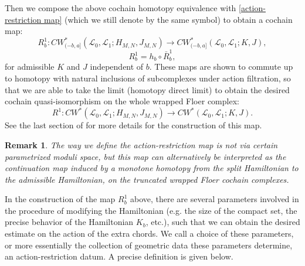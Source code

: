 \documentclass{amsart}
\newtheorem{remark}[theorem]{Remark}
\numberwithin{equation}{section}
\numberwithin{figure}{section}
\begin{document}
	Then we compose the above cochain homotopy equivalence with \eqref{action-restriction map} (which we still denote by the same symbol) to obtain a cochain map:
\begin{equation}\label{action-restriction map, with a Hamiltonian independent of filtration}
R^{1}_{b}: CW^{*}_{(-b, a]}(\mathcal{L}_{0}, \mathcal{L}_{1}; H_{M, N}, J_{M, N}) \to CW^{*}_{(-b, a]}(\mathcal{L}_{0}, \mathcal{L}_{1}; K, J),
\end{equation}
\begin{equation}
R^{1}_{b} = h_{b} \circ \bar{R}^{1}_{b},
\end{equation}
for admissible $K$ and $J$ independent of $b$. These maps are shown to commute up to homotopy with natural inclusions of subcomplexes under action filtration, so that we are able to take the limit (homotopy direct limit) to obtain the desired cochain quasi-isomorphism on the whole wrapped Floer complex:
\begin{equation}\label{action-restriction map on the whole wrapped Floer complex}
R^{1}: CW^{*}(\mathcal{L}_{0}, \mathcal{L}_{1}; H_{M, N}, J_{M, N}) \to CW^{*}(\mathcal{L}_{0}, \mathcal{L}_{1}; K, J).
\end{equation}
See the last section of \cite{Gao1} for more details for the construction of this map. \par

\begin{remark}
	The way we define the action-restriction map is not via certain parametrized moduli space, but this map can alternatively be interpreted as the continuation map induced by a monotone homotopy from the split Hamiltonian to the admissible Hamiltonian, on the truncated wrapped Floer cochain complexes.
\end{remark}

	In the construction of the map $R^{1}_{b}$ above, there are several parameters involved in the procedure of modifying the Hamiltonian (e.g. the size of the compact set, the precise behavior of the Hamiltonian $K_{b}$, etc.), such that we can obtain the desired estimate on the action of the extra chords. We call a choice of these parameters, or more essentially the collection of geometric data these parameters determine, an action-restriction datum. A precise definition is given below. \par
\end{document}
